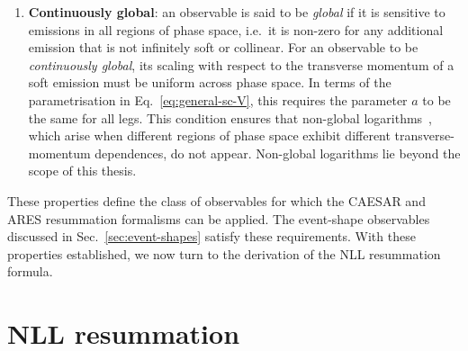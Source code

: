 \begin{enumerate}
\begin{enumerate}
\begin{enumerate}
\item Analogously, a collinear splitting of an existing emission
        must also leave the observable unchanged:
\begin{multline}
\label{eq:rIRC-b-ii}
\lim_{\mu\to0}\lim_{\bar{v}\to0}\frac{1}{\bar{v}}
V(\{\tilde{p}\},\kappa_1(\bar{v}\zeta_1),\dots,\{\kappa_{i_a},\kappa_{i_b}\}(\bar{v}\zeta_i,\mu),\dots,\kappa_m(\bar{v}\zeta_m))\\
=\lim_{\bar{v}\to0}\frac{1}{\bar{v}}V(\{\tilde{p}\},\kappa_1(\bar{v}\zeta_1),\dots,
\kappa_m(\bar{v}\zeta_m))\,.
\end{multline}
\end{enumerate}
\end{enumerate}
The rIRC safety condition is precisely what allows the leading-logarithmic
contributions to exponentiate. Observables that violate rIRC safety do not
exponentiate (cf.\ Eq.~\eqref{eq:resummed-cumulant}), a well-known example is the \textsc{JADE} 3-jet resolution
parameter in $e^+e^-$ collisions~\cite{Catani:1992tm}. 

\item \textbf{Continuously global}: an observable is said to be
\emph{global} if it is sensitive to emissions in all regions of phase
space, i.e.\ it is non-zero for any additional emission that is not
infinitely soft or collinear. For an observable to be \emph{continuously
global}, its scaling with respect to the transverse momentum of a soft
emission must be uniform across phase space. In terms of the
parametrisation in Eq.~\eqref{eq:general-sc-V}, this requires the
parameter $a$ to be the same for all legs. This condition ensures 
that non-global logarithms~\cite{Dasgupta:2001sh,Dasgupta:2002dc},
which arise when different regions of phase space exhibit different
transverse-momentum dependences, do not appear. 
Non-global logarithms lie beyond the scope of this thesis.
\end{enumerate}
These properties define the class of observables for which the
\textsc{CAESAR} and \textsc{ARES} resummation formalisms can be applied.
The event-shape observables discussed in Sec.~\ref{sec:event-shapes} satisfy these
requirements. With these properties established, we now turn to the
derivation of the NLL resummation formula.

\section{NLL resummation}
\label{sec:NLL-resum}


